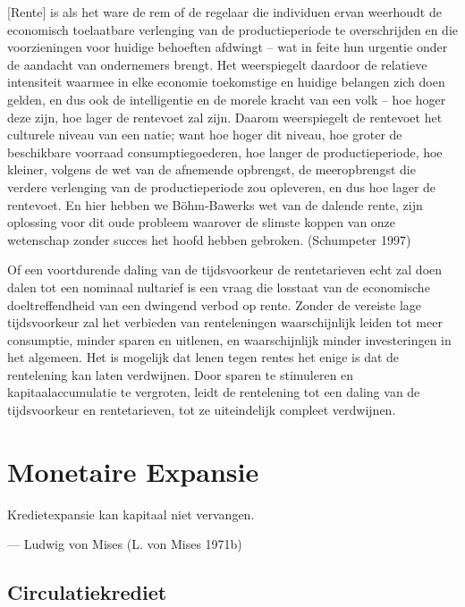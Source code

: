 \documentclass[
  a5paper,
  smalldemyvopaper,11pt,twoside,onecolumn,openright,extrafontsizes,
hidelinks]{memoir}
\begin{document}
{[}Rente{]} is als het ware de rem of de regelaar die individuen ervan
weerhoudt de economisch toelaatbare verlenging van de productieperiode
te overschrijden en die voorzieningen voor huidige behoeften afdwingt --
wat in feite hun urgentie onder de aandacht van ondernemers brengt. Het
weerspiegelt daardoor de relatieve intensiteit waarmee in elke economie
toekomstige en huidige belangen zich doen gelden, en dus ook de
intelligentie en de morele kracht van een volk -- hoe hoger deze zijn,
hoe lager de rentevoet zal zijn. Daarom weerspiegelt de rentevoet het
culturele niveau van een natie; want hoe hoger dit niveau, hoe groter de
beschikbare voorraad consumptiegoederen, hoe langer de productieperiode,
hoe kleiner, volgens de wet van de afnemende opbrengst, de meeropbrengst
die verdere verlenging van de productieperiode zou opleveren, en dus hoe
lager de rentevoet. En hier hebben we Böhm-Bawerks wet van de dalende
rente, zijn oplossing voor dit oude probleem waarover de slimste koppen
van onze wetenschap zonder succes het hoofd hebben gebroken. (Schumpeter
1997)

Of een voortdurende daling van de tijdsvoorkeur de rentetarieven echt
zal doen dalen tot een nominaal nultarief is een vraag die losstaat van
de economische doeltreffendheid van een dwingend verbod op rente. Zonder
de vereiste lage tijdsvoorkeur zal het verbieden van renteleningen
waarschijnlijk leiden tot meer consumptie, minder sparen en uitlenen, en
waarschijnlijk minder investeringen in het algemeen. Het is mogelijk dat
lenen tegen rentes het enige is dat de rentelening kan laten verdwijnen.
Door sparen te stimuleren en kapitaalaccumulatie te vergroten, leidt de
rentelening tot een daling van de tijdsvoorkeur en rentetarieven, tot ze
uiteindelijk compleet verdwijnen.

\chapter{Monetaire Expansie}\label{sec-monetaire-expansie}

Kredietexpansie kan kapitaal niet vervangen.

--- Ludwig von Mises (L. von Mises 1971b)

\section{Circulatiekrediet}\label{circulatiekrediet}
\end{document}
